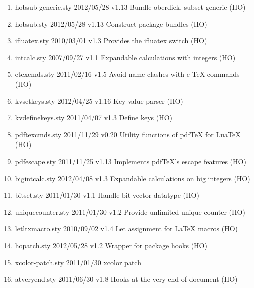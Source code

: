 \begin{enumerate}
\item hobsub-generic.sty 2012/05/28 v1.13 Bundle oberdiek, subset generic (HO)
\item hobsub.sty 2012/05/28 v1.13 Construct package bundles (HO)
\item ifluatex.sty 2010/03/01 v1.3 Provides the ifluatex switch (HO)
\item intcalc.sty 2007/09/27 v1.1 Expandable calculations with integers (HO)
\item etexcmds.sty 2011/02/16 v1.5 Avoid name clashes with e-TeX commands (HO)
\item kvsetkeys.sty 2012/04/25 v1.16 Key value parser (HO)
\item kvdefinekeys.sty 2011/04/07 v1.3 Define keys (HO)
\item pdftexcmds.sty 2011/11/29 v0.20 Utility functions of pdfTeX for LuaTeX (HO)
\item pdfescape.sty 2011/11/25 v1.13 Implements pdfTeX's escape features (HO)
\item bigintcalc.sty  2012/04/08 v1.3 Expandable calculations on big integers (HO)
\item bitset.sty 2011/01/30 v1.1 Handle bit-vector datatype (HO)
\item uniquecounter.sty 2011/01/30 v1.2 Provide unlimited unique counter (HO)
\item letltxmacro.sty 2010/09/02 v1.4 Let assignment for LaTeX macros (HO)
\item hopatch.sty 2012/05/28 v1.2 Wrapper for package hooks (HO)
\item xcolor-patch.sty 2011/01/30 xcolor patch
\item atveryend.sty 2011/06/30 v1.8 Hooks at the very end of document (HO)

\end{enumerate}
